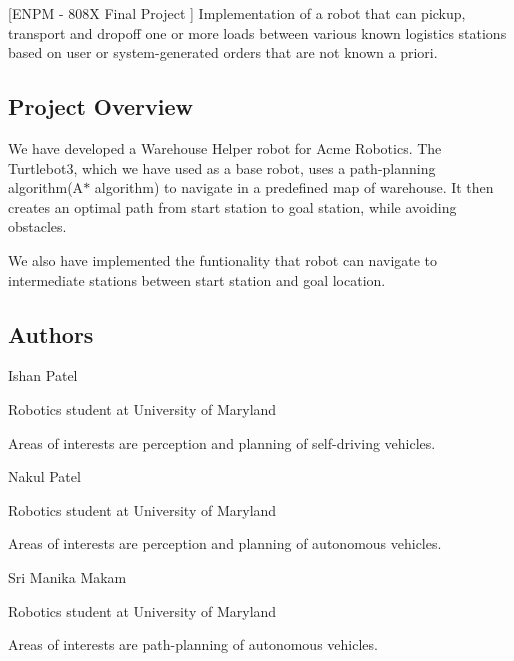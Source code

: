 \mbox{[}E\+N\+PM -\/ 808X Final Project \mbox{]} Implementation of a robot that can pickup, transport and dropoff one or more loads between various known logistics stations based on user or system-\/generated orders that are not known a priori.

\href{https://travis-ci.org/Ip-umd/The_Warehouse_Helper}{\tt } \href{https://coveralls.io/github/Ip-umd/The_Warehouse_Helper?branch=iteration1}{\tt } \href{https://opensource.org/licenses/BSD-3-Clause}{\tt }

\subsection*{Project Overview}

We have developed a Warehouse Helper robot for Acme Robotics. The Turtlebot3, which we have used as a base robot, uses a path-\/planning algorithm(\+A$\ast$ algorithm) to navigate in a predefined map of warehouse. It then creates an optimal path from start station to goal station, while avoiding obstacles.

We also have implemented the funtionality that robot can navigate to intermediate stations between start station and goal location.

\subsection*{Authors}

Ishan Patel
\begin{DoxyItemize}
\item Robotics student at University of Maryland
\item Areas of interests are perception and planning of self-\/driving vehicles.
\end{DoxyItemize}

Nakul Patel
\begin{DoxyItemize}
\item Robotics student at University of Maryland
\item Areas of interests are perception and planning of autonomous vehicles.
\end{DoxyItemize}

Sri Manika Makam
\begin{DoxyItemize}
\item Robotics student at University of Maryland
\item Areas of interests are path-\/planning of autonomous vehicles.
\end{DoxyItemize}

